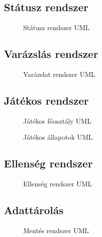 \subsection{Státusz rendszer}

\begin{figure}[H]
	\noindent{}
	\caption{Státusz rendszer UML}
	\label{StatusSystem}
\end{figure}

\subsection{Varázslás rendszer}

\begin{figure}[H]
	\noindent{}
	\caption{Varázslat rendszer UML}
	\label{MagicSystem}
\end{figure}

\subsection{Játékos rendszer}

\begin{figure}[H]
	\noindent{}
	\caption{Játékos főosztály UML}
	\label{PlayerSystem1}
\end{figure}

\begin{figure}[H]
	\noindent{}
	\caption{Játékos állapotok UML}
	\label{PlayerSystem2}
\end{figure}

\subsection{Ellenség rendszer}

\begin{figure}[H]
	\noindent{}
	\caption{Ellenség rendszer UML}
	\label{EnemySystem}
\end{figure}

\subsection{Adattárolás}
\begin{figure}[H]
	\noindent{}
	\caption{Mentés rendszer UML}
	\label{SaveSystem}
\end{figure}

